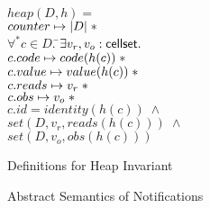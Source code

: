 \documentclass[preprint,natbib]{sigplanconf}
\begin{document}
\begin{figure}
\begin{tabbing}
$heap(D,h) = $ \\
\;\;$counter \mapsto |D| \;* $ \\
\;\;$\forall^* c \in D.\;$\=$\exists v_r, v_o : \mbox{\textsf{{cellset}}}.\;$ \\
                         \>$c.code \mapsto code(h(c))   \;* $ \\
                         \>$c.value \mapsto value(h(c)) \;* $ \\
                         \>$c.reads \mapsto v_r \;* $ \\
                         \>$c.obs   \mapsto v_o \;* $ \\
                         \>$c.id    = identity(h(c)) \;\land$ \\
                         \>$set(D, v_r, reads(h(c))) \;\land$ \\
                         \>$set(D, v_o, obs(h(c)))$ \\[1em]
\end{tabbing}
\caption{Definitions for Heap Invariant}
\label{heap-invariant}
\end{figure}

\begin{figure}
\caption{Abstract Semantics of Notifications}
\label{abs-semantics}
\end{figure}
\end{document}
